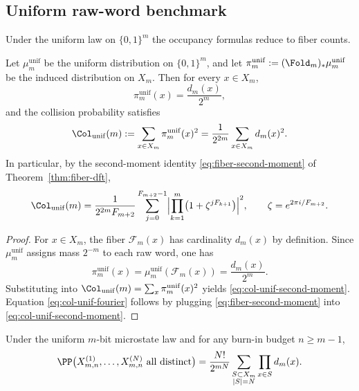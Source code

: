 \subsection{Uniform raw-word benchmark}\label{app:uniform-collision}

Under the uniform law on $\{0,1\}^m$ the occupancy formulas reduce to fiber counts.

\begin{proposition}\label{prop:uniform-collision}
Let $\mu_m^{\mathrm{unif}}$ be the uniform distribution on $\{0,1\}^m$, and let $\pi_m^{\mathrm{unif}}:=(\Fold_m)_*\mu_m^{\mathrm{unif}}$ be the induced distribution on $X_m$. Then for every $x\in X_m$,
\[
\pi_m^{\mathrm{unif}}(x)=\frac{d_m(x)}{2^m},
\]
and the collision probability satisfies
\begin{equation}\label{eq:col-unif-second-moment}
\Col_{\mathrm{unif}}(m):=\sum_{x\in X_m}\pi_m^{\mathrm{unif}}(x)^2
=\frac{1}{2^{2m}}\sum_{x\in X_m} d_m(x)^2.
\end{equation}
In particular, by the second-moment identity \eqref{eq:fiber-second-moment} of Theorem~\ref{thm:fiber-dft},
\begin{equation}\label{eq:col-unif-fourier}
\Col_{\mathrm{unif}}(m)
=
\frac{1}{2^{2m}F_{m+2}}
\sum_{j=0}^{F_{m+2}-1}
\Bigl|
\prod_{k=1}^m \bigl(1+\zeta^{jF_{k+1}}\bigr)
\Bigr|^2,
\qquad
\zeta=e^{2\pi i/F_{m+2}}.
\end{equation}
\end{proposition}

\begin{proof}
For $x\in X_m$, the fiber $\mathcal{F}_m(x)$ has cardinality $d_m(x)$ by definition. Since $\mu_m^{\mathrm{unif}}$ assigns mass $2^{-m}$ to each raw word, one has
\[
\pi_m^{\mathrm{unif}}(x)=\mu_m^{\mathrm{unif}}(\mathcal{F}_m(x))=\frac{d_m(x)}{2^m}.
\]
Substituting into $\Col_{\mathrm{unif}}(m)=\sum_x \pi_m^{\mathrm{unif}}(x)^2$ yields \eqref{eq:col-unif-second-moment}. Equation \eqref{eq:col-unif-fourier} follows by plugging \eqref{eq:fiber-second-moment} into \eqref{eq:col-unif-second-moment}.
\end{proof}

\begin{corollary}\label{cor:uniform-occupancy}
Under the uniform $m$-bit microstate law and for any burn-in budget $n\ge m-1$,
\begin{equation}\label{eq:uniform-occupancy}
\PP\bigl(X^{(1)}_{m,n},\dots,X^{(N)}_{m,n}\text{ all distinct}\bigr)
=
\frac{N!}{2^{mN}}
\sum_{\substack{S\subset X_m\\|S|=N}}
\prod_{x\in S} d_m(x).
\end{equation}
\end{corollary}

